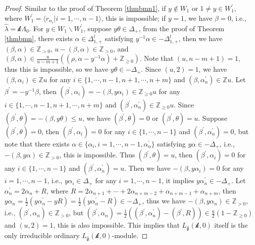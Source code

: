 \documentclass[12pt]{article}
\begin{document}
\begin{proof}
Similar to the proof of Theorem \ref{thmbmn1},
if $y\notin W_1$ or $1\ne y\in W_1^\prime$, where $W_1^\prime=\langle r_{\alpha_i}|i=1,\cdots,n-1\rangle$,
 this is impossible;
if $y=1$, we have $\beta=0$, i.e., $\hat{\lambda}=\mathcal{k}\Lambda_0$.
For $y\in W_1\backslash W_1^\prime$,
suppose $y\theta\in \Delta_+$, from the proof of Theorem \ref{thmbmn},
there exists \(\alpha \in \Delta_{1,+}^l\) satisfying \(y^{-1}\alpha \in -\Delta_{1,+}^l\), then we have $(\beta, \alpha)\in \mathbb{Z}_{>0}$,
$u-(\beta,\alpha)\in\mathbb{Z}_{>0}$,
and $(\beta,\alpha)\in \frac{u}{n-m+1}((\rho,\alpha-y^{-1}\alpha)+\mathbb{Z}_{\geq0})$. Note that $(u,n-m+1)=1$, thus this is impossible,
so we have $y\theta\in -\Delta_+$. %
Since $(u,2)=1$, we have $(\beta,\alpha_i)\in \mathbb{Z}u$ for any $i\in\{1,\cdots,n-1,n+1,\cdots,n+m\}$ and $(\beta,\alpha_n^\prime)\in \mathbb{Z}u$.
Let $\beta^\prime=-y^{-1}\beta$, then $(\beta^\prime, \alpha_i)=-(\beta,y\alpha_i)\in\mathbb{Z}_{\geq0}u$ for any $i\in\{1,\cdots,n-1,n+1,\cdots,n+m\}$
and $(\beta^\prime, \alpha_n^\prime)\in\mathbb{Z}_{\geq0}u$.
Since $(\beta^\prime, \theta)=-(\beta,y\theta)\leq u$,
we have $(\beta^\prime, \theta)=0$ or $(\beta^\prime, \theta)=u$.
Suppose $(\beta^\prime, \theta)=0$, then $(\beta^\prime, \alpha_i)=0$ for any $i\in\{1,\cdots,n-1\}$
and $(\beta^\prime, \alpha_n^\prime)=0$, but
note that there exists $\alpha\in\{\alpha_i,i=1,\cdots,n-1,\alpha_n^\prime\}$
satisfying $y\alpha\in -\Delta_+$, i.e., $-(\beta,y\alpha)\in\mathbb{Z}_{>0}$, this is impossible.
Thus $(\beta^\prime, \theta)=u$,
then $(\beta^\prime, \alpha_i)=0$ for any $i\in\{1,\cdots,n-1\}$
and $(\beta^\prime, \alpha_n^\prime)=u$.
Then we have $-(\beta,y\alpha_i)=0$ for any $i=1,\cdots,n-1$,
i.e., $y\alpha_i\in \Delta_+$ for any $i=1,\cdots,n-1$,
it implies $y\alpha_n^\prime\in -\Delta_+$.
Let $\alpha_n^\prime=2\alpha_n+R$, where $R=2\alpha_{n+1}+\cdots+2\alpha_{n+m-2}+\alpha_{n+m-1}+\alpha_{n+m}$,
then $y\alpha_n=\frac{1}{2}(y\alpha_n^\prime-yR)=\frac{1}{2}(y\alpha_n^\prime-R)\in -\Delta_+$,
thus we have $-(\beta,y\alpha_n)\in\mathbb{Z}_{>0}$, i.e., $(\beta^\prime, \alpha_n)\in\mathbb{Z}_{>0}$,
but $(\beta^\prime, \alpha_n)=\frac{1}{2}((\beta^\prime,\alpha_n^\prime)-(\beta^\prime,R))\in\frac{u}{2}(1-\mathbb{Z}_{\geq0})$ and $(u,2)=1$,
 this is also impossible.
 This implies that $L_{\widehat{\mathfrak{g}}}(\mathcal{k},0)$ itself is the only irreducible ordinary $L_{\widehat{\mathfrak{g}}}(\mathcal{k},0)$-module.
\end{proof}
\end{document}
